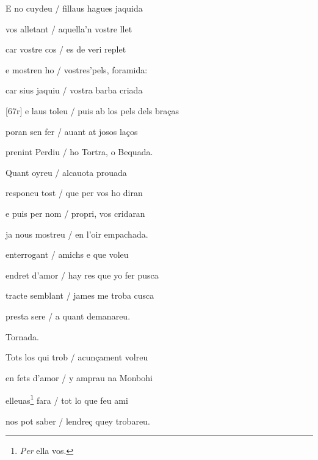 \documentclass[12pt]{article}
\begin{document}
\begin{estrofa}

 E no cuydeu / fillaus hagues jaquida

 vos alletant / aquella'n vostre llet

 car vostre cos / es de veri replet

 e mostren ho / vostres'pels, foramida:

 car sius jaquiu / vostra barba criada

 [67r] e laus toleu / puis ab los pels dels bra\c{c}as

 poran sen fer / auant at josos la\c{c}os

 prenint Perdiu / ho Tortra, o Bequada.

\end{estrofa}



\begin{estrofa}

 Quant oyreu / alcauota prouada

 responeu tost / que per vos ho diran

 e puis per nom / propri, vos cridaran

 ja nous mostreu / en l'oir empachada.

 enterrogant / amichs e que voleu

 endret d'amor / hay res que yo fer pusca

 tracte semblant / james me troba cusca

 presta sere / a quant demanareu.

\end{estrofa}


\begin{estrofaExtra}%




\begin{tornada}

Tornada.

\end{tornada}


\end{estrofaExtra}


\begin{estrofa}

 Tots los qui trob / acun\c{c}ament volreu

 en fets d'amor / y amprau na Monbohi

 elleuas\footnote{\textit{Per} ella vos.} fara / tot lo que feu ami

 nos pot saber / lendre\c{c} quey trobareu.

\end{estrofa}
\end{document}
